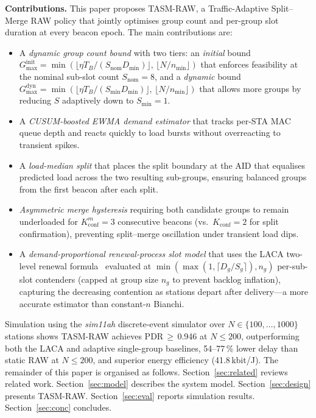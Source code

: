 \documentclass[conference]{IEEEtran}
\begin{document}
\textbf{Contributions.}
This paper proposes TASM-RAW, a Traffic-Adaptive Split--Merge RAW policy
that jointly optimises group count and per-group slot duration at every
beacon epoch.
The main contributions are:
\begin{itemize}
  \item A \emph{dynamic group count bound} with two tiers: an
        \emph{initial} bound $G_\mathrm{max}^\mathrm{init}\!=\!
        \min\!\left(\lfloor\eta T_B/(S_\mathrm{nom} D_\mathrm{min})\rfloor,\,
        \lfloor N/n_\mathrm{min}\rfloor\right)$ that enforces feasibility
        at the nominal sub-slot count $S_\mathrm{nom}\!=\!8$, and a
        \emph{dynamic} bound $G_\mathrm{max}^\mathrm{dyn}\!=\!
        \min\!\left(\lfloor\eta T_B/(S_\mathrm{min} D_\mathrm{min})\rfloor,\,
        \lfloor N/n_\mathrm{min}\rfloor\right)$ that allows more groups
        by reducing $S$ adaptively down to $S_\mathrm{min}\!=\!1$.
  \item A \emph{CUSUM-boosted EWMA demand estimator} that tracks per-STA
        MAC queue depth and reacts quickly to load bursts without
        overreacting to transient spikes.
  \item A \emph{load-median split} that places the split boundary at the
        AID that equalises predicted load across the two resulting
        sub-groups, ensuring balanced groups from the first beacon
        after each split.
  \item \emph{Asymmetric merge hysteresis} requiring both candidate groups
        to remain underloaded for $K_\mathrm{conf}^m\!=\!3$ consecutive beacons
        (vs.\ $K_\mathrm{conf}\!=\!2$ for split confirmation),
        preventing split--merge oscillation under transient load dips.
  \item A \emph{demand-proportional renewal-process slot model} that uses
        the LACA two-level renewal formula~\cite{taramit2023}
        evaluated at $\min(\max(1,\lceil D_g/S_g\rceil),n_g)$
        per-sub-slot contenders (capped at group size $n_g$ to prevent
        backlog inflation), capturing the decreasing contention as
        stations depart after delivery---a more accurate estimator than
        constant-$n$ Bianchi.
\end{itemize}

Simulation using the \textit{sim11ah} discrete-event simulator over
$N\!\in\!\{100,\ldots,1000\}$ stations shows TASM-RAW achieves
PDR\,$\geq$\,0.946 at $N\!\leq\!200$, outperforming both the LACA
and adaptive single-group baselines, 54--77\,\% lower delay than static
RAW at $N\!\leq\!200$, and superior energy efficiency (41.8\,kbit/J).
The remainder of this paper is organised as follows.
Section~\ref{sec:related} reviews related work.
Section~\ref{sec:model} describes the system model.
Section~\ref{sec:design} presents TASM-RAW.
Section~\ref{sec:eval} reports simulation results.
Section~\ref{sec:conc} concludes.
\end{document}
